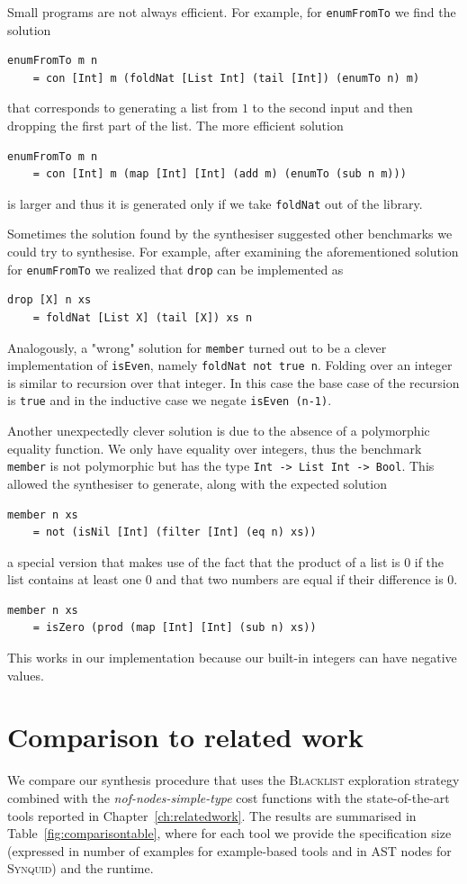 Small programs are not always efficient. For example, for \lstinline?enumFromTo? we find the solution
\begin{lstlisting}
enumFromTo m n
    = con [Int] m (foldNat [List Int] (tail [Int]) (enumTo n) m)
\end{lstlisting}
that corresponds to generating a list from $1$ to the second input and then dropping the first part of the list. The more efficient solution
\begin{lstlisting}
enumFromTo m n
    = con [Int] m (map [Int] [Int] (add m) (enumTo (sub n m)))
\end{lstlisting}
is larger and thus it is generated only if we take \lstinline?foldNat? out of the library.

Sometimes the solution found by the synthesiser suggested other benchmarks we could try to synthesise. For example, after examining the aforementioned solution for \lstinline?enumFromTo? we realized that \lstinline?drop? can be implemented as
\begin{lstlisting}
drop [X] n xs
    = foldNat [List X] (tail [X]) xs n
\end{lstlisting}
Analogously, a "wrong" solution for \lstinline?member? turned out to be a clever implementation of \lstinline?isEven?, namely \lstinline?foldNat not true n?. Folding over an integer is similar to recursion over that integer. In this case the base case of the recursion is \lstinline?true? and in the inductive case we negate \lstinline?isEven (n-1)?.

Another unexpectedly clever solution is due to the absence of a polymorphic equality function. We only have equality over integers, thus the benchmark \lstinline?member? is not polymorphic but has the type \lstinline?Int -> List Int -> Bool?. This allowed the synthesiser to generate, along with the expected solution
\begin{lstlisting}
member n xs
    = not (isNil [Int] (filter [Int] (eq n) xs))
\end{lstlisting}
a special version that makes use of the fact that the product of a list is $0$ if the list contains at least one $0$ and that two numbers are equal if their difference is $0$.
\begin{lstlisting}
member n xs
    = isZero (prod (map [Int] [Int] (sub n) xs))
\end{lstlisting}
This works in our implementation because our built-in integers can have negative values.


\section{Comparison to related work}
We compare our synthesis procedure that uses the \textsc{Blacklist} exploration strategy combined with the \textit{nof-nodes-simple-type} cost functions with the state-of-the-art tools reported in Chapter~\ref{ch:relatedwork}. The results are summarised in Table~\ref{fig:comparisontable}, where for each tool we provide the specification size (expressed in number of examples for example-based tools and in AST nodes for \textsc{Synquid}) and the runtime.

